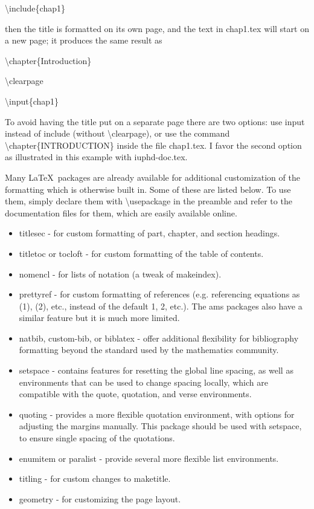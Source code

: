 \textbackslash include\{chap1\}
\medskip

\noindent then the title is formatted on its own page, and the text in chap1.tex will start on a new page; it produces
the same result as
\medskip

\textbackslash chapter\{Introduction\}

\textbackslash clearpage

\textbackslash input\{chap1\}
\medskip

\noindent To avoid having the title put on a separate page there are two options: use input instead of include
(without \textbackslash clearpage), or use the command \textbackslash chapter\{INTRODUCTION\} inside the file chap1.tex.
I favor the second option as illustrated in this example with iuphd-doc.tex.

Many \LaTeX \ packages are already available for additional customization of the formatting which is otherwise built in.
Some of these are listed below.  To use them, simply declare them with \textbackslash usepackage in the preamble
and refer to the documentation files for them, which are easily available online.

\begin{itemize}
 \item titlesec - for custom formatting of part, chapter, and section headings.
 \item titletoc or tocloft - for custom formatting of the table of contents.
 \item nomencl - for lists of notation (a tweak of makeindex).
 \item prettyref - for custom formatting of references (e.g. referencing equations as (1), (2), etc., instead of the default
       1, 2, etc.).  The ams packages also have a similar feature but it is much more limited.
 \item natbib, custom-bib, or biblatex - offer additional flexibility for bibliography formatting beyond the standard used by
       the mathematics community.
 \item setspace - contains features for resetting the global line spacing, as well as environments that can be used to change
       spacing locally, which are compatible with the quote, quotation, and verse environments.
 \item quoting - provides a more flexible quotation environment, with options for adjusting the margins manually.  This package
     should be used with setspace, to ensure single spacing of the quotations.
 \item enumitem or paralist - provide several more flexible list environments.
 \item titling - for custom changes to maketitle.
 \item geometry - for customizing the page layout.
\end{itemize}

